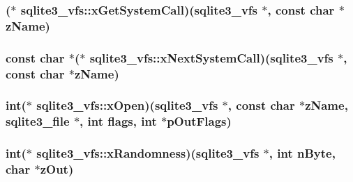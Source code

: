 \hypertarget{structsqlite3__vfs_a604384e58c645e06b6db38d8a45e1103}{
\subsubsection[{x\-Get\-System\-Call}]{($\ast$ sqlite3\-\_\-vfs\-::x\-Get\-System\-Call)({\bf sqlite3\-\_\-vfs} $\ast$, const char $\ast${\bf z\-Name})}}\label{structsqlite3__vfs_a604384e58c645e06b6db38d8a45e1103}
\hypertarget{structsqlite3__vfs_ac2930d34749977f39b1bbc27dc1de2b2}{
\subsubsection[{x\-Next\-System\-Call}]{\setlength{\rightskip}{0pt plus 5cm}const char $\ast$($\ast$ sqlite3\-\_\-vfs\-::x\-Next\-System\-Call)({\bf sqlite3\-\_\-vfs} $\ast$, const char $\ast${\bf z\-Name})}}\label{structsqlite3__vfs_ac2930d34749977f39b1bbc27dc1de2b2}
\hypertarget{structsqlite3__vfs_a5f35d5528d8fdf1d26e1e206879afbe1}{
\subsubsection[{x\-Open}]{\setlength{\rightskip}{0pt plus 5cm}int($\ast$ sqlite3\-\_\-vfs\-::x\-Open)({\bf sqlite3\-\_\-vfs} $\ast$, const char $\ast${\bf z\-Name}, {\bf sqlite3\-\_\-file} $\ast$, int flags, int $\ast$p\-Out\-Flags)}}\label{structsqlite3__vfs_a5f35d5528d8fdf1d26e1e206879afbe1}
\hypertarget{structsqlite3__vfs_ace3fcb41cb01a947457532f645ba4c88}{
\subsubsection[{x\-Randomness}]{\setlength{\rightskip}{0pt plus 5cm}int($\ast$ sqlite3\-\_\-vfs\-::x\-Randomness)({\bf sqlite3\-\_\-vfs} $\ast$, int n\-Byte, char $\ast$z\-Out)}}\label{structsqlite3__vfs_ace3fcb41cb01a947457532f645ba4c88}
